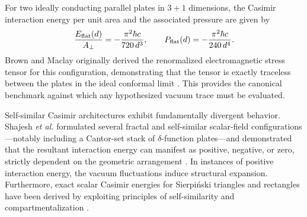\documentclass[12pt,letterpaper]{article}
\begin{document}
For two ideally conducting parallel plates in $3+1$ dimensions, the Casimir interaction energy per unit area and the associated pressure are given by
\begin{equation}
\frac{E_{\rm flat}(d)}{A_\perp} = -\frac{\pi^2\hbar c}{720\,d^3}, \qquad P_{\rm flat}(d) = -\frac{\pi^2\hbar c}{240\,d^4}.
\label{eq:flat_casimir_prior}
\end{equation}
Brown and Maclay originally derived the renormalized electromagnetic stress tensor for this configuration, demonstrating that the tensor is exactly traceless between the plates in the ideal conformal limit \cite{brownmaclay1969}.
This provides the canonical benchmark against which any hypothesized vacuum trace must be evaluated.

Self-similar Casimir architectures exhibit fundamentally divergent behavior. Shajesh \emph{et al.} formulated several fractal and self-similar scalar-field configurations---notably including a Cantor-set stack of $\delta$-function plates---and demonstrated that the resultant interaction energy can manifest as positive, negative, or zero, strictly dependent on the geometric arrangement \cite{shajesh2016}.
In instances of positive interaction energy, the vacuum fluctuations induce structural expansion.
Furthermore, exact scalar Casimir energies for Sierpi\'nski triangles and rectangles have been derived by exploiting principles of self-similarity and compartmentalization \cite{shajesh2017}.
\end{document}

